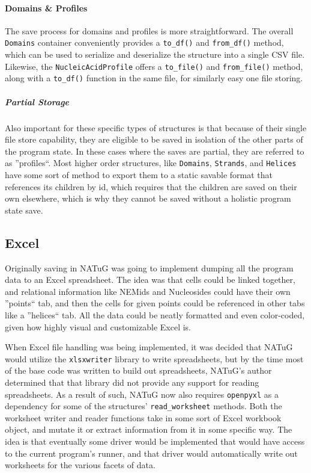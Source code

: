 \documentclass[titlepage]{article}
\begin{document}
	\paragraph{Domains \& Profiles}
	The save process for domains and profiles is more straightforward. The overall \texttt{Domains} container conveniently provides a \texttt{to\_df()} and \texttt{from\_df()} method, which can be used to serialize and deserialize the structure into a single CSV file. Likewise, the \texttt{NucleicAcidProfile} offers a \texttt{to\_file()} and \texttt{from\_file()} method, along with a \texttt{to\_df()} function in the same file, for similarly easy one file storing.
	
	\subparagraph{Partial Storage}
	Also important for these specific types of structures is that because of their single file store capability, they are eligible to be saved in isolation of the other parts of the program state. In these cases where the saves are partial, they are referred to as ''profiles``. Most higher order structures, like \texttt{Domains}, \texttt{Strands}, and \texttt{Helices} have some sort of method to export them to a static savable format that references its children by id, which requires that the children are saved on their own elsewhere, which is why they cannot be saved without a holistic program state save. 
	
	\subsection{Excel}
	Originally saving in NATuG was going to implement dumping all the program data to an Excel spreadsheet. The idea was that cells could be linked together, and relational information like NEMids and Nucleosides could have their own ''points`` tab, and then the cells for given points could be referenced in other tabs like a ''helices`` tab. All the data could be neatly formatted and even color-coded, given how highly visual and customizable Excel is.
	
	When Excel file handling was being implemented, it was decided that NATuG would utilize the \texttt{xlsxwriter} library to write spreadsheets, but by the time most of the base code was written to build out spreadsheets, NATuG's author determined that that library did not provide any support for reading spreadsheets. As a result of such, NATuG now also requires \texttt{openpyxl} as a dependency for some of the structures' \texttt{read\_worksheet} methods. Both the worksheet writer and reader functions take in some sort of Excel workbook object, and mutate it or extract information from it in some specific way. The idea is that eventually some driver would be implemented that would have access to the current program's runner, and that driver would automatically write out worksheets for the various facets of data.
	
\end{document}
